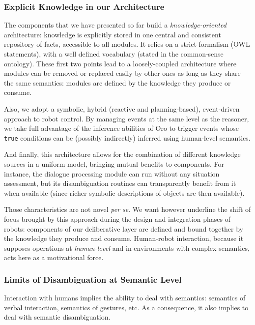 \documentclass[preprint,3p,times]{elsarticle}
\begin{document}
\subsubsection{Explicit Knowledge in our Architecture}

The components that we have presented so far build a \emph{knowledge-oriented}
architecture: knowledge is explicitly stored in one central and consistent
repository of facts, accessible to all modules. It relies on a strict formalism
(OWL statements), with a well defined vocabulary (stated in the common-sense
ontology). These first two points lead to a loosely-coupled architecture
where modules can be removed or replaced easily by other ones as long as they
share the same semantics: modules are defined by the knowledge they produce or
consume.

Also, we adopt a symbolic, hybrid (reactive and planning-based), event-driven
approach to robot control. By managing events at the same level as the reasoner,
we take full advantage of the inference abilities of {\sc Oro} to trigger events
whose \texttt{true} conditions can be (possibly indirectly) inferred using
human-level semantics.

And finally, this architecture allows for the combination of different
knowledge sources in a uniform model, bringing mutual
benefits to components. For instance, the dialogue processing module can
run without any situation assessment, but its disambiguation routines
can transparently benefit from it when available (since richer symbolic
descriptions of objects are then available).

Those characteristics are not novel \emph{per se}. We want however underline the
shift of focus brought by this approach during the design and integration phases
of robots: components of our deliberative layer are defined and bound together
by the knowledge they produce and consume. Human-robot interaction, because it
supposes operations at \emph{human-level} and in environments with complex
semantics, acts here as a motivational force.


\subsubsection{Limits of Disambiguation at Semantic Level}

Interaction with humans implies the ability to deal with semantics: semantics of
verbal interaction, semantics of gestures, etc.  As a consequence, it also
implies to deal with semantic disambiguation.
\end{document}
